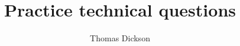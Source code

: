 \documentclass[12pt, answers]{exam}
\title{Practice technical questions}
\author{Thomas Dickson}
\begin{document}
\maketitle
\begin{singlespace}

\end{singlespace}
\printbibliography
\end{document}
